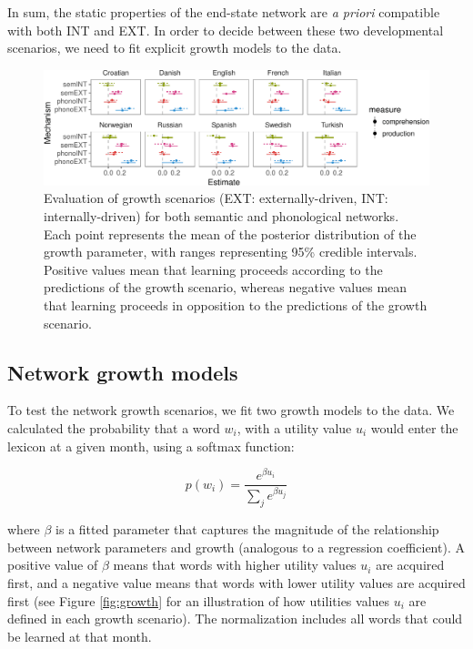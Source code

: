 \documentclass[english,floatsintext,man]{apa6}
\theoremstyle{definition}
\theoremstyle{definition}
\theoremstyle{definition}
\theoremstyle{remark}
\begin{document}
In sum, the static properties of the end-state network are \emph{a
priori} compatible with both INT and EXT. In order to decide between
these two developmental scenarios, we need to fit explicit growth models
to the data.

\begin{figure}[!h]
\includegraphics[width=\textwidth]{ms_files/figure-latex/growthPred-1} \caption{Evaluation of growth scenarios (EXT: externally-driven, INT: internally-driven) for both semantic and phonological networks. Each point represents the mean of the posterior distribution of the growth parameter, with ranges representing 95\% credible intervals. Positive values mean that learning proceeds according to the predictions of the growth scenario, whereas negative values mean that learning proceeds in opposition to the predictions of the growth scenario.}\label{fig:growthPred}
\end{figure}

\subsection{Network growth models}\label{network-growth-models}

To test the network growth scenarios, we fit two growth models to the
data. We calculated the probability that a word \(w_i\), with a utility
value \(u_i\) would enter the lexicon at a given month, using a softmax
function:

\begin{equation}
 p(w_i)= \frac{e^{\beta u_i}}{\sum_j e^{\beta u_j} }
\end{equation}

\noindent where \(\beta\) is a fitted parameter that captures the
magnitude of the relationship between network parameters and growth
(analogous to a regression coefficient). A positive value of \(\beta\)
means that words with higher utility values \(u_i\) are acquired first,
and a negative value means that words with lower utility values are
acquired first (see Figure \ref{fig:growth} for an illustration of how
utilities values \(u_i\) are defined in each growth scenario). The
normalization includes all words that could be learned at that month.
\end{document}
